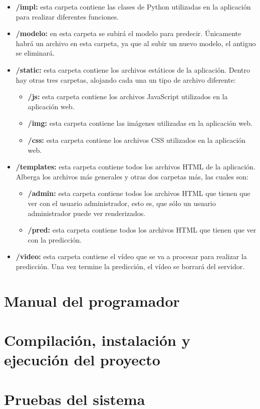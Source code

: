 \begin{itemize}
	\item \textbf{/impl:} esta carpeta contiene las clases de Python utilizadas en la aplicación para realizar diferentes funciones.
	\item \textbf{/modelo:} en esta carpeta se subirá el modelo para predecir. Únicamente habrá un archivo en esta carpeta, ya que al subir un nuevo modelo, el antiguo se eliminará.
	\item \textbf{/static:} esta carpeta contiene los archivos estáticos de la aplicación. Dentro hay otras tres carpetas, alojando cada una un tipo de archivo diferente:
	\begin{itemize}
		\item \textbf{/js:} esta carpeta contiene los archivos JavaScript utilizados en la aplicación web.
		\item \textbf{/img:} esta carpeta contiene las imágenes utilizadas en la aplicación web.
		\item \textbf{/css:} esta carpeta contiene los archivos CSS utilizados en la aplicación web.
	\end{itemize}
	\item \textbf{/templates:} esta carpeta contiene todos los archivos HTML de la aplicación. Alberga los archivos más generales y otras dos carpetas más, las cuales son:
	\begin{itemize}
		\item \textbf{/admin:} esta carpeta contiene todos los archivos HTML que tienen que ver con el usuario administrador, esto es, que sólo un usuario administrador puede ver renderizados.
		\item \textbf{/pred:} esta carpeta contiene todos los archivos HTML que tienen que ver con la predicción.
	\end{itemize}
	\item \textbf{/video:} esta carpeta contiene el vídeo que se va a procesar para realizar la predicción. Una vez termine la predicción, el vídeo se borrará del servidor.
\end{itemize}

\section{Manual del programador}

\section{Compilación, instalación y ejecución del proyecto}

\section{Pruebas del sistema}

